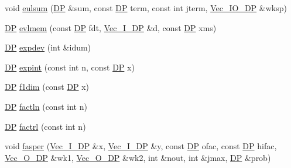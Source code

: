 \begin{DoxyCompactItemize}
\item 
void \mbox{\hyperlink{namespaceNR_af6b58017e35503e394fd95ac85f8fbb7}{eulsum}} (\mbox{\hyperlink{namespaceNR_af6ff762dd605ff477b8e52387253a02a}{DP}} \&sum, const \mbox{\hyperlink{namespaceNR_af6ff762dd605ff477b8e52387253a02a}{DP}} term, const int jterm, \mbox{\hyperlink{namespaceNR_ab293e06a6bf799d8a7ed932b6852bcb8}{Vec\+\_\+\+I\+O\+\_\+\+DP}} \&wksp)
\item 
\mbox{\hyperlink{namespaceNR_af6ff762dd605ff477b8e52387253a02a}{DP}} \mbox{\hyperlink{namespaceNR_acf9bcd45ac074c4fc27723f2093d332e}{evlmem}} (const \mbox{\hyperlink{namespaceNR_af6ff762dd605ff477b8e52387253a02a}{DP}} fdt, \mbox{\hyperlink{namespaceNR_a9f943da53862537c552e2a770cb170ae}{Vec\+\_\+\+I\+\_\+\+DP}} \&d, const \mbox{\hyperlink{namespaceNR_af6ff762dd605ff477b8e52387253a02a}{DP}} xms)
\item 
\mbox{\hyperlink{namespaceNR_af6ff762dd605ff477b8e52387253a02a}{DP}} \mbox{\hyperlink{namespaceNR_aa445323c2e4f1c7d6859208169d37307}{expdev}} (int \&idum)
\item 
\mbox{\hyperlink{namespaceNR_af6ff762dd605ff477b8e52387253a02a}{DP}} \mbox{\hyperlink{namespaceNR_a03af1157f0cf4a00d857e0dde2483104}{expint}} (const int n, const \mbox{\hyperlink{namespaceNR_af6ff762dd605ff477b8e52387253a02a}{DP}} x)
\item 
\mbox{\hyperlink{namespaceNR_af6ff762dd605ff477b8e52387253a02a}{DP}} \mbox{\hyperlink{namespaceNR_a6c415158b378bbd03f785e29d8a7ac1f}{f1dim}} (const \mbox{\hyperlink{namespaceNR_af6ff762dd605ff477b8e52387253a02a}{DP}} x)
\item 
\mbox{\hyperlink{namespaceNR_af6ff762dd605ff477b8e52387253a02a}{DP}} \mbox{\hyperlink{namespaceNR_a828437d33b110b7b79516767e7df7b23}{factln}} (const int n)
\item 
\mbox{\hyperlink{namespaceNR_af6ff762dd605ff477b8e52387253a02a}{DP}} \mbox{\hyperlink{namespaceNR_ac76d8c81ea3f7dacb7bc39f8f2e67f0a}{factrl}} (const int n)
\item 
void \mbox{\hyperlink{namespaceNR_a28ce9fba247ed103e2ffb545d671840e}{fasper}} (\mbox{\hyperlink{namespaceNR_a9f943da53862537c552e2a770cb170ae}{Vec\+\_\+\+I\+\_\+\+DP}} \&x, \mbox{\hyperlink{namespaceNR_a9f943da53862537c552e2a770cb170ae}{Vec\+\_\+\+I\+\_\+\+DP}} \&y, const \mbox{\hyperlink{namespaceNR_af6ff762dd605ff477b8e52387253a02a}{DP}} ofac, const \mbox{\hyperlink{namespaceNR_af6ff762dd605ff477b8e52387253a02a}{DP}} hifac, \mbox{\hyperlink{namespaceNR_a970094d23441f8ef6a45282a7eb2103d}{Vec\+\_\+\+O\+\_\+\+DP}} \&wk1, \mbox{\hyperlink{namespaceNR_a970094d23441f8ef6a45282a7eb2103d}{Vec\+\_\+\+O\+\_\+\+DP}} \&wk2, int \&nout, int \&jmax, \mbox{\hyperlink{namespaceNR_af6ff762dd605ff477b8e52387253a02a}{DP}} \&prob)

\end{DoxyCompactItemize}
